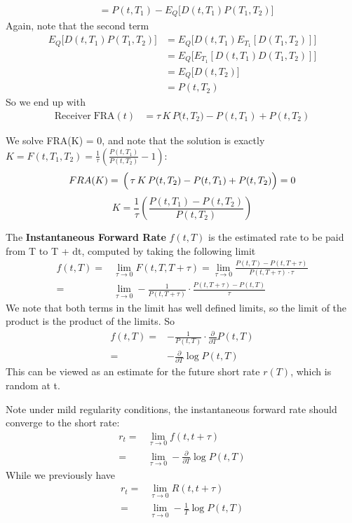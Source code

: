\begin{definition}
\begin{align*}
        &= P(t, T_1) - E_Q \bigl[ D(t, T_1) P(T_1, T_2) \bigr]
    \end{align*}
    Again, note that the second term
    \begin{align*}
        E_Q \bigl[ D(t, T_1) P(T_1, T_2) \bigr]
        &= E_Q \bigl[ D(t, T_1) E_{T_1} [  D(T_1, T_2) ] \bigr]\\
        &= E_Q \bigl[ E_{T_1} [ D(t, T_1) D(T_1, T_2) ] \bigr]\\
        &= E_Q \bigl[ D(t, T_2) \bigr] \\
        &= P(t, T_2)
    \end{align*}
    So we end up with 
    \begin{align}
        \mathrm{Receiver\;FRA}(t) 
        &= \tau\,K\,P\bigl(t, T_2\bigr) - P(t, T_1) + P(t, T_2) \label{eq:fra}
    \end{align}
\end{definition}

We solve FRA(K) = 0, and note that the solution is exactly 
$K = F(t, T_1, T_2) 
= \frac{1}{\tau} \left( \frac{P(t, T_1)}{P(t, T_2)} - 1 \right)$:
\[
   FRA(K) =  \,\Bigl(\,\tau\,K\,P(t, T_2) - P(t, T_1) + P(t, T_2)\Bigr) = 0
\]
\[
   K = \frac{1}{\tau} \left( \frac{P(t, T_1) - P(t, T_2)}{P(t, T_2)} \right)
\]

\begin{definition}
    The \textbf{Instantaneous Forward Rate} $f(t, T)$ is the estimated rate to be paid from T to T + dt, 
    computed by taking the following limit \\
    \begin{align*}
        f(t, T) =& \lim_{\tau \to 0} F(t, T, T + \tau) = \lim_{\tau \to 0} \frac{P(t, T) - P(t, T + \tau)}{P(t, T + \tau) \cdot \tau} \\
        =& \lim_{\tau \to 0} -\frac{1}{P(t, T + \tau)} \cdot \frac{P(t, T + \tau) - P(t, T)}{\tau} 
    \end{align*}
    We note that both terms in the limit has well defined limits, 
    so the limit of the product is the product of the limits. So
    \begin{align*}
        f(t, T) 
        =& -\frac{1}{P(t, T)} \cdot \frac{\partial}{\partial T} P(t, T) \\
        =& -\frac{\partial}{\partial T} \log P(t, T)
    \end{align*}
    This can be viewed as an estimate for the future short rate $r(T)$, which is random at t.
\end{definition}
Note under mild regularity conditions, the instantaneous forward rate should converge to the short rate:
\begin{align*}
    r_t =& \lim_{\tau \to 0} f(t, t + \tau) \\
    =& \lim_{\tau \to 0} -\frac{\partial}{\partial T} \log P(t, T)
\end{align*}
While we previously have
\begin{align*}
    r_t =& \lim_{\tau \to 0} R(t, t + \tau) \\
    =& \lim_{\tau \to 0} -\frac{1}{T} \log P(t, T) 
\end{align*}

